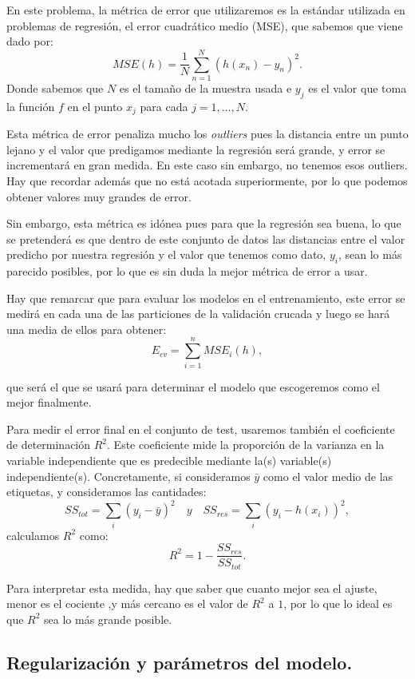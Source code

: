 \documentclass[a4paper, 20pt]{article}
\begin{document}
En este problema, la métrica de error que utilizaremos es la estándar utilizada en problemas de regresión, el error cuadrático medio (MSE), que sabemos que viene dado por:
\[
MSE(h) = \frac{1}{N} \sum_{n = 1}^N (h(x_n) - y_n)^2.
\]
Donde sabemos que $N$ es el tamaño de la muestra usada e $y_j$ es el valor que toma la función $f$ en el punto $x_j$ para cada $j = 1,\dots ,N$. 

Esta métrica de error penaliza mucho los \emph{outliers} pues la distancia entre un punto lejano y el valor que predigamos mediante la regresión será grande, y error se incrementará en gran medida. En este caso sin embargo, no tenemos esos outliers. Hay que recordar además que no está acotada superiormente, por lo que podemos obtener valores muy grandes de error.

Sin embargo, esta métrica es idónea pues para que la regresión sea buena, lo que se pretenderá es que dentro de este conjunto de datos las distancias entre el valor predicho por nuestra regresión y el valor que tenemos como dato, $y_i$, sean lo más parecido posibles, por lo que es sin duda la mejor métrica de error a usar.

Hay que remarcar que para evaluar los modelos en el entrenamiento, este error se medirá en cada una de las particiones de la validación crucada y luego se hará una media de ellos para obtener:
$$
E_{cv} = \sum_{i = 1}^n MSE_i(h),
$$

que será el que se usará para determinar el modelo que escogeremos como el mejor finalmente.

Para medir el error final en el conjunto de test, usaremos también el coeficiente de determinación $R^2$. Este coeficiente mide la proporción de la varianza en la variable independiente que es predecible mediante la(s) variable(s) independiente(s). Concretamente, si consideramos $\bar{y}$ como el valor medio de las etiquetas, y consideramos las cantidades:
\[
SS_{tot} = \sum_i(y_i - \bar{y})^2 \quad y \quad SS_{res} = \sum_i(y_i - h(x_i))^2,
\]
calculamos $R^2$ como:
$$
R^2 =  1 - \frac{SS_{res}}{SS_{tot}}.
$$

Para interpretar esta medida, hay que saber que cuanto mejor sea el ajuste, menor es el cociente ,y más cercano es el valor de $R^2$ a $1$, por lo que lo ideal es que $R^2$ sea lo más grande posible.

\subsection{Regularización y parámetros del modelo.}
\end{document}
